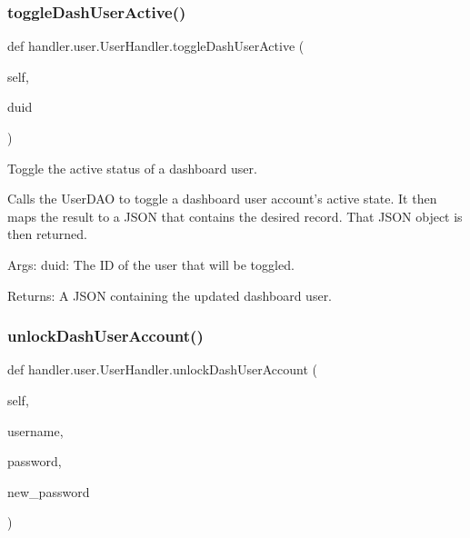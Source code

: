 \subsubsection{\texorpdfstring{toggle\+Dash\+User\+Active()}{toggleDashUserActive()}}
{\footnotesize\ttfamily def handler.\+user.\+User\+Handler.\+toggle\+Dash\+User\+Active (\begin{DoxyParamCaption}\item[{}]{self,  }\item[{}]{duid }\end{DoxyParamCaption})}

\begin{DoxyVerb}Toggle the active status of a dashboard user.

Calls the UserDAO to toggle a dashboard user account's active state. 
It then maps the result to a JSON that contains the desired record. 
That JSON object is then returned.

Args:
    duid: The ID of the user that will be toggled.

Returns:
    A JSON containing the updated dashboard user.
\end{DoxyVerb}
 \mbox{\label{classhandler_1_1user_1_1_user_handler_aa2de9a5da6421296215e75fafeb9b9d4}} 
\subsubsection{\texorpdfstring{unlock\+Dash\+User\+Account()}{unlockDashUserAccount()}}
{\footnotesize\ttfamily def handler.\+user.\+User\+Handler.\+unlock\+Dash\+User\+Account (\begin{DoxyParamCaption}\item[{}]{self,  }\item[{}]{username,  }\item[{}]{password,  }\item[{}]{new\+\_\+password }\end{DoxyParamCaption})}

